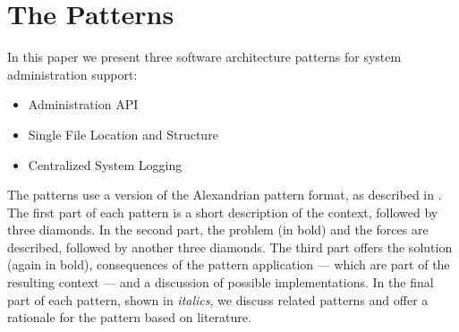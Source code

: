 \section{The Patterns}

In this paper we present three software architecture patterns for system administration support: 
\begin{itemize} 
	\item {\sc Administration API}
	\item {\sc Single File Location and Structure}
	\item {\sc Centralized System Logging}
\end{itemize}

The patterns use a version of the Alexandrian pattern format, as described in \cite{alexander1977}. The first part of each pattern is a short description of the context, followed by three diamonds. In the second part, the problem (in bold) and the forces are described, followed by another three diamonds. The third part offers the solution (again in bold), consequences of the pattern application --- which are part of the resulting context --- and a discussion of possible implementations. In the final part of each pattern, shown in \textit{italics}, we discuss related patterns and offer a rationale for the pattern based on literature.
